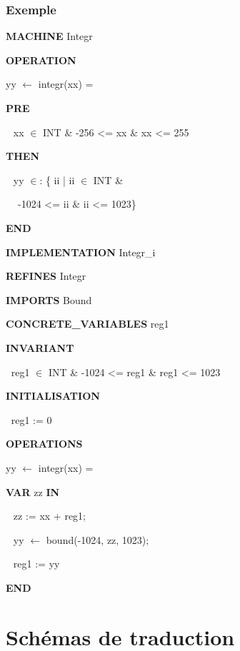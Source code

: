 \documentclass[10pt]{beamer}
\begin{document}
\begin{frame}
\frametitle{Exemple}
\begin{scriptsize}
\setlength{\columnseprule}{0.05cm}
\begin{multicols}{2}
\begin{semiverbatim}
\textbf{MACHINE} Integr


\textbf{OPERATION}

yy $\leftarrow$ integr(xx) =

  \textbf{PRE}

$~~$    xx $\in$ INT \& -256 <= xx \& xx <= 255

  \textbf{THEN}

$~~$    yy $\in$: \{ ii | ii $\in$ INT \& 

$~~$$~~$          -1024 <= ii \& ii <= 1023\}

  \textbf{END}
\end{semiverbatim}

\columnbreak

\begin{semiverbatim}
\textbf{IMPLEMENTATION} Integr\_i

\textbf{REFINES} Integr

\textbf{IMPORTS} Bound

\textbf{CONCRETE\_VARIABLES} reg1

\textbf{INVARIANT}

$~$  reg1 $\in$ INT \& -1024 <= reg1 \& reg1 <= 1023

\textbf{INITIALISATION}

$~$  reg1 := 0


\textbf{OPERATIONS}


yy $\leftarrow$ integr(xx) =

\textbf{VAR} zz \textbf{IN}

$~~$   zz := xx + reg1; 

$~~$   yy $\leftarrow$ bound(-1024, zz, 1023);

$~~$   reg1 := yy

\textbf{END}
\end{semiverbatim}
\end{multicols}
\end{scriptsize}


\end{frame}



\section{Schémas de traduction}
\frame{\sectionpage}
\end{document}
